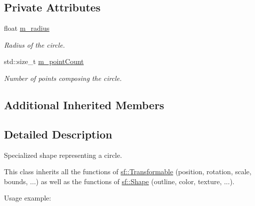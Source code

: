 \subsection*{Private Attributes}
\begin{DoxyCompactItemize}
\item 
\mbox{\label{classsf_1_1_circle_shape_a5a82c296c19e0a374c46204a8870fa1c}} 
float \mbox{\hyperlink{classsf_1_1_circle_shape_a5a82c296c19e0a374c46204a8870fa1c}{m\+\_\+radius}}
\begin{DoxyCompactList}\small\item\em Radius of the circle. \end{DoxyCompactList}\item 
\mbox{\label{classsf_1_1_circle_shape_adb17b4b4a80acf58f03cbb03f720393a}} 
std\+::size\+\_\+t \mbox{\hyperlink{classsf_1_1_circle_shape_adb17b4b4a80acf58f03cbb03f720393a}{m\+\_\+point\+Count}}
\begin{DoxyCompactList}\small\item\em Number of points composing the circle. \end{DoxyCompactList}\end{DoxyCompactItemize}
\subsection*{Additional Inherited Members}


\subsection{Detailed Description}
Specialized shape representing a circle. 

\begin{DoxyVerb}\end{DoxyVerb}


This class inherits all the functions of \mbox{\hyperlink{classsf_1_1_transformable}{sf\+::\+Transformable}} (position, rotation, scale, bounds, ...) as well as the functions of \mbox{\hyperlink{classsf_1_1_shape}{sf\+::\+Shape}} (outline, color, texture, ...).

Usage example\+: 
\begin{DoxyCode}{0}
\end{DoxyCode}


